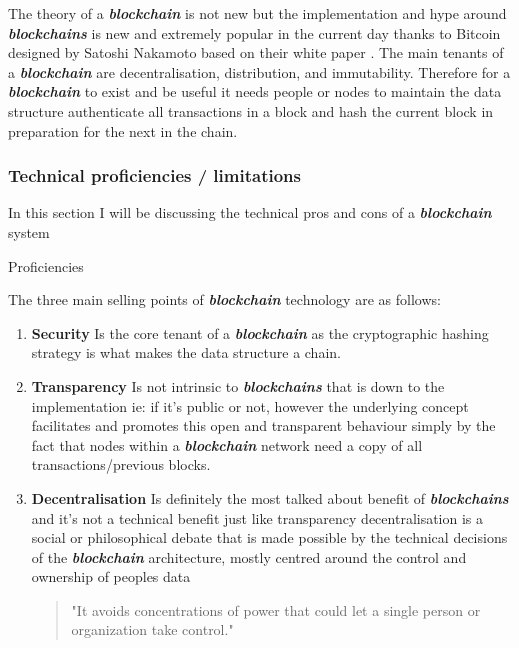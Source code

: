 \documentclass[12pt]{article}
\newcommand{\keyword}[1]{\textbf{\textit{#1}}}
\begin{document}
The theory of a \keyword{blockchain} is not new \cite{origins_blockchain} but the implementation and hype around \keyword{blockchains} is new and extremely popular in the current day thanks to Bitcoin designed by Satoshi Nakamoto based on their white paper \cite{nakamoto2008bitcoin}. The main tenants of a \keyword{blockchain} are decentralisation, distribution, and immutability. Therefore for a \keyword{blockchain} to exist and be useful it needs people or nodes to maintain the data structure authenticate all transactions in a block and hash the current block in preparation for the next in the chain.


\subsubsection{Technical proficiencies / limitations}

In this section I will be discussing the technical pros and cons of a \keyword{blockchain} system

Proficiencies

The three main selling points of \keyword{blockchain} technology are as follows:

\begin{enumerate}
	\item \textbf{Security} Is the core tenant of a \keyword{blockchain} as the cryptographic hashing strategy is what makes the data structure a chain.
	\item \textbf{Transparency} Is not intrinsic to \keyword{blockchains} that is down to the implementation ie: if it's public or not, however the underlying concept facilitates and promotes this open and transparent behaviour simply by the fact that nodes within a \keyword{blockchain} network need a copy of all transactions/previous blocks.
	\item \textbf{Decentralisation} Is definitely the most talked about benefit of \keyword{blockchains} and it's not a technical benefit just like transparency decentralisation is a social or philosophical debate that is made possible by the technical decisions of the \keyword{blockchain} architecture, mostly centred around the control and ownership of peoples data \begin{quote}"It avoids concentrations of power that could let a single person or organization take control."\cite{bohme2015bitcoin}\end{quote} 
\end{enumerate}
\end{document}
